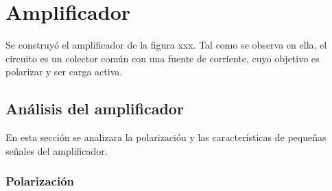 \documentclass[../../main.tex]{subfiles}
\begin{document}
\section{Amplificador}
Se construyó el amplificador de la figura xxx. Tal como se observa en ella, el circuito es un colector común con una fuente de corriente, cuyo objetivo es polarizar y ser carga activa.
\subsection{Análisis del amplificador}
En esta sección se analizara la polarización y las características de pequeñas señales del amplificador.
\subsubsection{Polarización}
\end{document}
